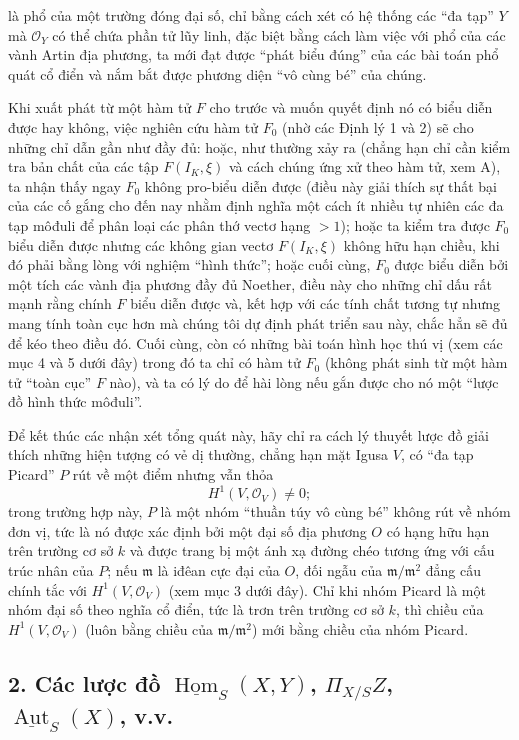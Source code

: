 là phổ của một trường đóng đại số, chỉ bằng cách xét có hệ thống các ``đa
tạp'' $Y$ mà $\mathcal O_Y$ có thể chứa phần tử lũy linh, đặc biệt bằng cách
làm việc với phổ của các vành Artin địa phương, ta mới đạt được ``phát biểu
đúng'' của các bài toán phổ quát cổ điển và nắm bắt được phương diện ``vô cùng
bé'' của chúng.

Khi xuất phát từ một hàm tử $F$ cho trước và muốn quyết định nó có biểu diễn
được hay không, việc nghiên cứu hàm tử $F_0$ (nhờ các Định lý 1 và 2) sẽ cho
những chỉ dẫn gần như đầy đủ: hoặc, như thường xảy ra (chẳng hạn chỉ cần kiểm
tra bản chất của các tập $F(I_K,\xi)$ và cách chúng ứng xử theo hàm tử, xem A),
ta nhận thấy ngay $F_0$ không pro-biểu diễn được (điều này giải thích sự thất
bại của các cố gắng cho đến nay nhằm định nghĩa một cách ít nhiều tự nhiên
các đa tạp môđuli để phân loại các phân thớ vectơ hạng $>1$); hoặc ta kiểm tra
được $F_0$ biểu diễn được nhưng các không gian vectơ $F(I_K,\xi)$ không hữu
hạn chiều, khi đó phải bằng lòng với nghiệm ``hình thức''; hoặc cuối cùng,
$F_0$ được biểu diễn bởi một tích các vành địa phương đầy đủ Noether, điều này
cho những chỉ dấu rất mạnh rằng chính $F$ biểu diễn được và, kết hợp với các
tính chất tương tự nhưng mang tính toàn cục hơn mà chúng tôi dự định phát
triển sau này, chắc hẳn sẽ đủ để kéo theo điều đó. Cuối cùng, còn có những bài
toán hình học thú vị (xem các mục 4 và 5 dưới đây) trong đó ta chỉ có hàm tử
$F_0$ (không phát sinh từ một hàm tử ``toàn cục'' $F$ nào), và ta có lý do để
hài lòng nếu gắn được cho nó một ``lược đồ hình thức môđuli''.

Để kết thúc các nhận xét tổng quát này, hãy chỉ ra cách lý thuyết lược đồ giải
thích những hiện tượng có vẻ dị thường, chẳng hạn mặt Igusa $V$, có ``đa tạp
Picard'' $P$ rút về một điểm nhưng vẫn thỏa
\[
  H^1(V,\mathcal O_V)\ne 0 ;
\]
trong trường hợp này, $P$ là một nhóm ``thuần túy vô cùng bé'' không rút về
nhóm đơn vị, tức là nó được xác định bởi một đại số địa phương $O$ có hạng hữu
hạn trên trường cơ sở $k$ và được trang bị một ánh xạ đường chéo tương ứng với
cấu trúc nhân của $P$; nếu $\mathfrak m$ là iđêan cực đại của $O$, đối ngẫu của
$\mathfrak m/\mathfrak m^2$ đẳng cấu chính tắc với
$H^1(V,\mathcal O_V)$ (xem mục 3 dưới đây). Chỉ khi nhóm Picard là một nhóm
đại số theo nghĩa cổ điển, tức là trơn trên trường cơ sở $k$, thì chiều của
$H^1(V,\mathcal O_V)$ (luôn bằng chiều của $\mathfrak m/\mathfrak m^2$) mới
bằng chiều của nhóm Picard.

\subsection*{2. Các lược đồ $\underline{\operatorname{Hom}}_S(X,Y)$,
$\Pi_{X/S}Z$, $\underline{\operatorname{Aut}}_S(X)$, v.v.}

